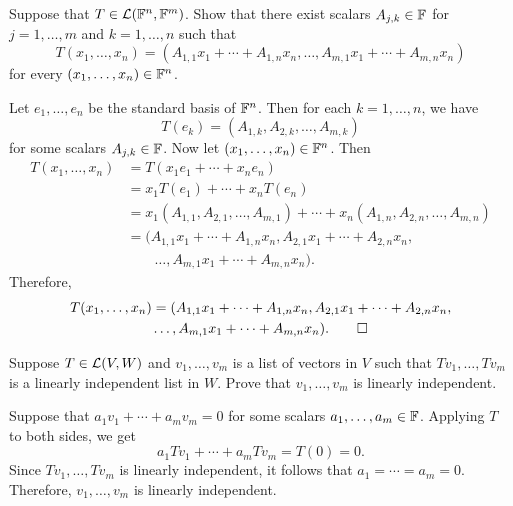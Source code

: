 \begin{exercise}
Suppose that $T\in\mathcal{L}(\mathbb{F}^n,\mathbb{F}^m)$. Show that there exist scalars
$A_{j,k}\in\mathbb{F}$ for $j=1,\dots,m$ and $k=1,\dots,n$ such that
\[ T(x_1,\dots,x_n)=(A_{1,1}x_1+\cdots+A_{1,n}x_n,\dots,
   A_{m,1}x_1+\cdots+A_{m,n}x_n) \]
for every $(x_1,\dots,x_n)\in\mathbb{F}^n$.
\end{exercise}
\begin{solution}
Let $e_1,\dots,e_n$ be the standard basis of $\mathbb{F}^n$. Then for each
$k=1,\dots,n$, we have
\[ T(e_k)=(A_{1,k},A_{2,k},\dots,A_{m,k}) \]
for some scalars $A_{j,k}\in\mathbb{F}$. Now let $(x_1,\dots,x_n)\in\mathbb{F}^n$. Then
\begin{align*}
T(x_1,\dots,x_n) &= T(x_1e_1+\cdots+x_ne_n)\\
  &= x_1T(e_1)+\cdots+x_nT(e_n)\\
  &= x_1(A_{1,1},A_{2,1},\dots,A_{m,1})+\cdots+x_n(A_{1,n},A_{2,n},\dots,A_{m,n})\\
  &= (A_{1,1}x_1+\cdots+A_{1,n}x_n,A_{2,1}x_1+\cdots+A_{2,n}x_n,\\
  &\qquad\dots,A_{m,1}x_1+\cdots+A_{m,n}x_n).
\end{align*}
Therefore,
\begin{multline*}
T(x_1,\dots,x_n)=(A_{1,1}x_1+\cdots+A_{1,n}x_n,A_{2,1}x_1+\cdots+A_{2,n}x_n,\\
  \dots,A_{m,1}x_1+\cdots+A_{m,n}x_n). \qedhere
\end{multline*}
\end{solution}

\begin{exercise}
Suppose $T\in\mathcal{L}(V,W)$ and $v_1,\dots,v_m$ is a list of vectors in $V$ such
that $Tv_1,\dots,Tv_m$ is a linearly independent list in $W$. Prove that
$v_1,\dots,v_m$ is linearly independent.
\end{exercise}
\begin{solution}
Suppose that $a_1v_1+\cdots+a_mv_m=0$ for some scalars $a_1,\dots,a_m\in\mathbb{F}$.
Applying $T$ to both sides, we get
\[ a_1Tv_1+\cdots+a_mTv_m=T(0)=0. \]
Since $Tv_1,\dots,Tv_m$ is linearly independent, it follows that
$a_1=\cdots=a_m=0$. Therefore, $v_1,\dots,v_m$ is linearly independent.
\end{solution}

